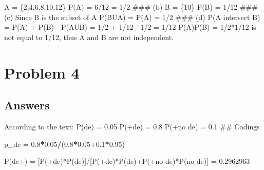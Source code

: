 \documentclass[
]{article}
\newenvironment{Shaded}{\begin{snugshade}}{\end{snugshade}}
\newcommand{\FloatTok}[1]{\textcolor[rgb]{0.00,0.00,0.81}{#1}}
\newcommand{\NormalTok}[1]{#1}
\newcommand{\OtherTok}[1]{\textcolor[rgb]{0.56,0.35,0.01}{#1}}
\newcommand{\SpecialCharTok}[1]{\textcolor[rgb]{0.81,0.36,0.00}{\textbf{#1}}}
\begin{document}
A = \{2,4,6,8,10,12\} P(A) = 6/12 = 1/2 \#\#\# (b) B = \{10\} P(B) =
1/12 \#\#\# (c) Since B is the subset of A P(BUA) = P(A) = 1/2 \#\#\#
(d) P(A intersect B) = P(A) + P(B) - P(AUB) = 1/2 + 1/12 - 1/2 = 1/12
P(A)P(B) = 1/2*1/12 is not equal to 1/12, thus A and B are not
independent.

\section{Problem 4}\label{problem-4}

\subsection{Answers}\label{answers-2}

According to the text: P(de) = 0.05 P(+\textbar de) = 0.8 P(+\textbar no
de) = 0.1 \#\# Codings

\begin{Shaded}
\begin{Highlighting}[]
\NormalTok{p\_de }\OtherTok{=} \FloatTok{0.8}\SpecialCharTok{*}\FloatTok{0.05}\SpecialCharTok{/}\NormalTok{(}\FloatTok{0.8}\SpecialCharTok{*}\FloatTok{0.05+0.1}\SpecialCharTok{*}\FloatTok{0.95}\NormalTok{)}
\end{Highlighting}
\end{Shaded}

P(de\textbar+) =
{[}P(+\textbar de)*P(de){]}/{[}P(+\textbar de)*P(de)+P(+\textbar no
de)*P(no de){]} = 0.2962963
\end{document}
